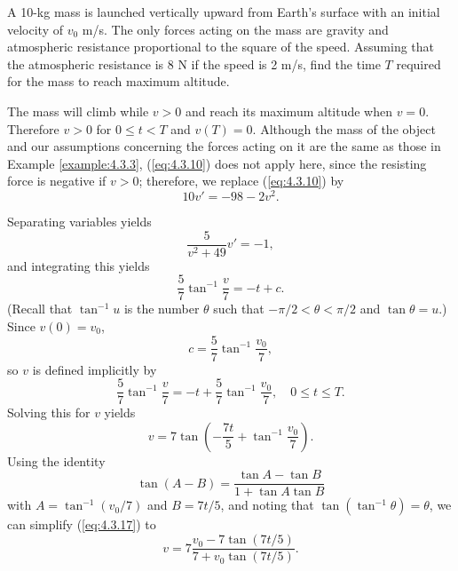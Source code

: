 \documentclass{ximera}
\begin{document}
\begin{example}
\begin{explanation}
\begin{center}
\end{center}

 
\end{explanation}
\end{example}
 
\begin{example}\label{example:4.3.4}
A 10-kg mass is launched vertically upward from Earth's surface with
an initial velocity of $v_0$ m/s. The only forces acting on the mass
are gravity and atmospheric resistance proportional to the square of
the speed. Assuming that the atmospheric resistance is 8 N if the
speed is 2 m/s, find the time $T$ required for the mass to reach
maximum altitude.
 
 
\begin{explanation}  The mass will
climb while $v>0 $ and reach its maximum altitude when $v=0$.
Therefore $v>0$ for $0\leq t<T$ and $v(T)=0$. Although the mass of
the object and our assumptions concerning the forces acting on it are
the same as those in Example \ref{example:4.3.3},  (\ref{eq:4.3.10}) does
not apply here, since the resisting force is negative if $v>0$;
therefore, we replace (\ref{eq:4.3.10}) by
\begin{equation} \label{eq:4.3.15}
10v'=-98-2v^2.
\end{equation}
 
Separating variables  yields
$$
\frac{5}{v^2+49}v'=-1,
$$
 and integrating this yields
$$
\frac{5}{7}\tan^{-1}\frac{v}{7}=-t+c.
$$
 (Recall that $\tan^{-1}u$ is the number $\theta$
such that $-\pi/2 < \theta < \pi/2$ and $\tan \theta=u$.)
 Since $v(0)=v_0$,
$$
c=\frac{5}{7}\tan^{-1}\frac{v_0}{7},
$$
so $v$ is defined implicitly by
\begin{equation} \label{eq:4.3.16}
\frac{5}{7} \tan^{-1}\frac{v}{7}=-t+\frac{5}{7}
\tan^{-1}\frac{v_0}{7}, \quad 0\leq t\leq T.
\end{equation}
Solving this for $v$ yields
\begin{equation} \label{eq:4.3.17}
v=7\tan\left(-\frac{7t}{5}+\tan^{-1}\frac{v_0}{7}\right).
\end{equation}
Using the identity
$$
\tan(A-B)=\frac{\tan A-\tan B}{1+\tan A\tan B}
$$
with $A=\tan^{-1}(v_0/7)$ and $B=7t/5$, and noting that
$\tan(\tan^{-1}\theta)=\theta$,
we can simplify (\ref{eq:4.3.17}) to
$$
v=7\frac{v_0-7\tan(7t/5)}{7+v_0\tan(7t/5)}.
$$
 

\end{explanation}
\end{example}
\end{document}
